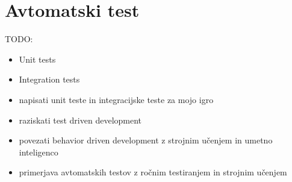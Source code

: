 

\chapter{Avtomatski test}
TODO:
\begin{itemize}
    \item Unit tests~\cite{sandi_pangerc}~\cite{gorazd_kovacic}
    \item Integration tests~\cite{sandi_pangerc}~\cite{gorazd_kovacic}
    \item napisati unit teste in integracijske teste za mojo igro~\cite{unity_test_runner}~\cite{nunit}
    \item raziskati test driven development
    \item povezati behavior driven development z strojnim učenjem in umetno inteligenco
    \item primerjava avtomatskih testov z ročnim testiranjem in strojnim učenjem
\end{itemize}